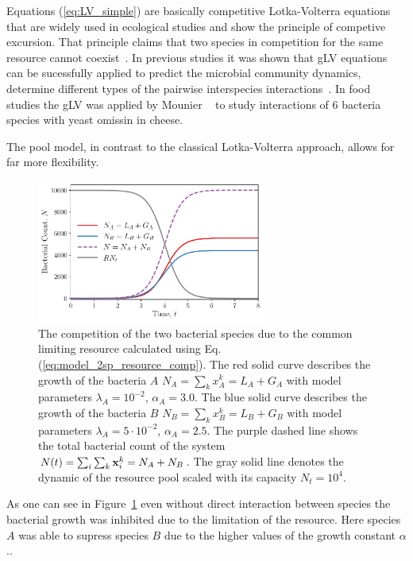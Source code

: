 \documentclass[10pt,A4paper]{article}
\begin{document}
Equations (\ref{eq:LV_simple}) are basically competitive Lotka-Volterra equations that are widely used in ecological studies and show the principle of competive excursion.
That principle claims that two species in competition for the same resource cannot coexist~\cite{wangersky_lotka-volterra_1978}. 
In previous studies it was shown that gLV equations can be sucessfully applied to predict the microbial community dynamics, determine different types of the pairwise interspecies interactions~\cite{dedrick_when_2023, stein_ecological_2013, venturelli_deciphering_2018, hoffmann_power_2007}.
In food studies the gLV was applied by Mounier \etal~\cite{mounier_microbial_2008} to study interactions of 6 bacteria species  with yeast omissin in cheese.

The pool model, in contrast to the classical Lotka-Volterra approach, allows for far more flexibility. 

\begin{figure}[H]
    \begin{center}
    \includegraphics[width=0.67\textwidth]{Figures/pool_model_2pools_resource_competition.pdf}
    \caption{{\footnotesize The competition of the two bacterial species due to the common limiting resource calculated using Eq. (\ref{eq:model_2sp_resource_comp}).
    The red solid curve describes the growth of the bacteria $A$ $N_A = \sum_{k} x_A^k = L_A+G_A$ with model parameters $\lambda_A=10^{-2}$, $\alpha_A=3.0$.
    The blue solid curve describes the growth of the bacteria $B$ $N_B = \sum_{k} x_B^k = L_B+G_B$ with model parameters $\lambda_A=5\cdot 10^{-2}$, $\alpha_A=2.5$.
    The purple dashed line shows the total bacterial count of the system  $N(t)=\sum_i\sum_k\mathbf{x}_i^k=N_A+N_B$.
    The gray solid line denotes the dynamic of the resource pool scaled with its capacity $N_t=10^4$.}}
    \label{fig:2pool_resource_2sp}
    \end{center}
\end{figure}
As one can see in Figure~\ref{fig:2pool_resource_2sp} even without direct interaction between species the bacterial growth was inhibited due to the limitation of the resource.
Here species $A$ was able to supress species $B$ due to the higher values of the growth constant $\alpha$..
\end{document}
